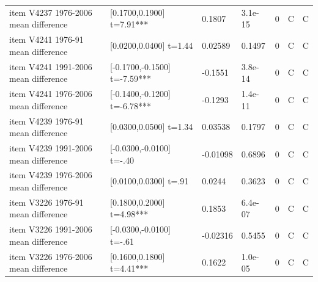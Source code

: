 {\begin{longtable}{@{}p{.245\linewidth}p{.17\linewidth}p{.17\linewidth}p{.085\linewidth}p{.060\linewidth}p{.08\linewidth}p{.07\linewidth}@{}}
item V4237 1976-2006 mean difference & [0.1700,0.1900] t=7.91*** & 0.1807 & 3.1e-15 & 0 & C & C\\
item V4241 1976-91 mean difference & [0.0200,0.0400] t=1.44 & 0.02589 & 0.1497 & 0 & C & C\\
item V4241 1991-2006 mean difference & [-0.1700,-0.1500] t=-7.59*** & -0.1551 & 3.8e-14 & 0 & C & C\\
item V4241 1976-2006 mean difference & [-0.1400,-0.1200] t=-6.78*** & -0.1293 & 1.4e-11 & 0 & C & C\\
item V4239 1976-91 mean difference & [0.0300,0.0500] t=1.34 & 0.03538 & 0.1797 & 0 & C & C\\
item V4239 1991-2006 mean difference & [-0.0300,-0.0100] t=-.40 & -0.01098 & 0.6896 & 0 & C & C\\
item V4239 1976-2006 mean difference & [0.0100,0.0300] t=.91 & 0.0244 & 0.3623 & 0 & C & C\\
item V3226 1976-91 mean difference & [0.1800,0.2000] t=4.98*** & 0.1853 & 6.4e-07 & 0 & C & C\\
item V3226 1991-2006 mean difference & [-0.0300,-0.0100] t=-.61 & -0.02316 & 0.5455 & 0 & C & C\\
item V3226 1976-2006 mean difference & [0.1600,0.1800] t=4.41*** & 0.1622 & 1.0e-05 & 0 & C & C\\
\end{longtable}}
